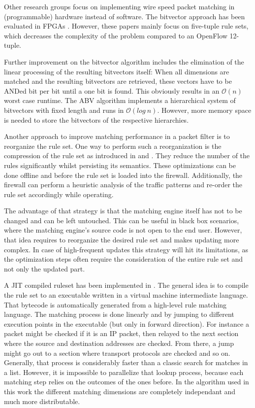 \documentclass[a4paper,
		12pt,
		parskip=full,
		titlepage
		]{scrartcl}
\begin{document}
Other research groups focus on implementing wire speed packet matching in (programmable) hardware instead of software.
The bitvector approach \cite{bv} has been evaluated in FPGAs \cite{bitvector_fpga} \cite{qu2013fast}.
However, these papers mainly focus on five-tuple rule sets, which decreases the complexity of the problem compared to an OpenFlow 12-tuple.

Further improvement on the bitvector algorithm includes the elimination of the linear processing of the resulting bitvectors itself:
When all dimensions are matched and the resulting bitvectors are retrieved, these vectors have to be ANDed bit per bit until a one bit is found.
This obviously results in an $\mathcal O(n)$ worst case runtime.
The ABV algorithm \cite{abv} implements a hierarchical system of bitvectors with fixed length and runs in $\mathcal O(log\ n)$.
However, more memory space is needed to store the bitvectors of the respective hierarchies.

Another approach to improve matching performance in a packet filter is to reorganize the rule set.
One way to perform such a reorganization is the compression of the rule set as introduced in \cite{firewall_compressor} and \cite{redundancy_removal}.
They reduce the number of the rules significantly whilst persisting its semantics.
These optimizations can be done offline and before the rule set is loaded into the firewall.
Additionally, the firewall can perform a heuristic analysis of the traffic patterns and re-order the rule set accordingly while operating.

The advantage of that strategy is that the matching engine itself has not to be changed and can be left untouched.
This can be useful in black box scenarios, where the matching engine's source code is not open to the end user.
However, that idea requires to reorganize the desired rule set and makes updating more complex.
In case of high-frequent updates this strategy will hit its limitations, 
as the optimization steps often require the consideration of the entire rule set and not only the updated part.

A JIT compiled ruleset has been implemented in \cite{bpfplus}.
The general idea is to compile the rule set to an executable written in a virtual machine intermediate language.
That bytecode is automatically generated from a high-level rule matching language.
The matching process is done linearly and by jumping to different execution points in the executable (but only in forward direction).
For instance a packet might be checked if it is an IP packet, then relayed to the next section where the source and destination addresses are checked.
From there, a jump might go out to a section where transport protocols are checked and so on.
Generally, that process is considerably faster than a classic search for matches in a list.
However, it is impossible to parallelize that lookup process, because each matching step relies on the outcomes of the ones before.
In the algorithm used in this work the different matching dimensions are 
completely independant and much more distributable.
\end{document}
